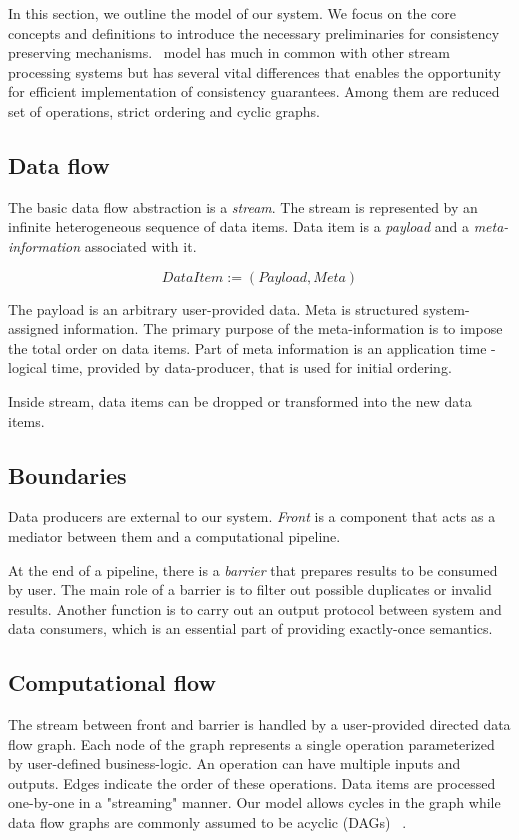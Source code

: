 
\label {fs-model-section}

In this section, we outline the model of our system. We focus on the core concepts and definitions to introduce the necessary preliminaries for consistency preserving mechanisms. \FlameStream\ model has much in common with other stream processing systems but has several vital differences that enables the opportunity for efficient implementation of consistency guarantees. Among them are reduced set of operations, strict ordering and cyclic graphs.

\subsection{Data flow}
The basic data flow abstraction is a {\it stream}. The stream is represented by an infinite heterogeneous sequence of data items. Data item is a {\it payload} and a {\it meta-information} associated with it. 

\[DataItem := (Payload, Meta)\]

The payload is an arbitrary user-provided data. Meta is structured system-assigned information. The primary purpose of the meta-information is to impose the total order on data items. Part of meta information is an application time - logical time, provided by data-producer, that is used for initial ordering.

Inside stream, data items can be dropped or transformed into the new data items.

\subsection{Boundaries}
Data producers are external to our system. {\em Front} is a component that acts as a mediator between them and a computational pipeline.

At the end of a pipeline, there is a {\em barrier} that prepares results to be consumed by user. The main role of a barrier is to filter out possible duplicates or invalid results. Another function is to carry out an output protocol between system and data consumers, which is an essential part of providing exactly-once semantics.

\subsection{Computational flow}
The stream between front and barrier is handled by a user-provided directed data flow graph. Each node of the graph represents a single operation parameterized by user-defined business-logic. An operation can have multiple inputs and outputs. Edges indicate the order of these operations. Data items are processed one-by-one in a "streaming" manner. Our model allows cycles in the graph while data flow graphs are commonly assumed to be acyclic (DAGs) 
~\cite{Zaharia:2016:ASU:3013530.2934664, Carbone:2017:SMA:3137765.3137777}.

